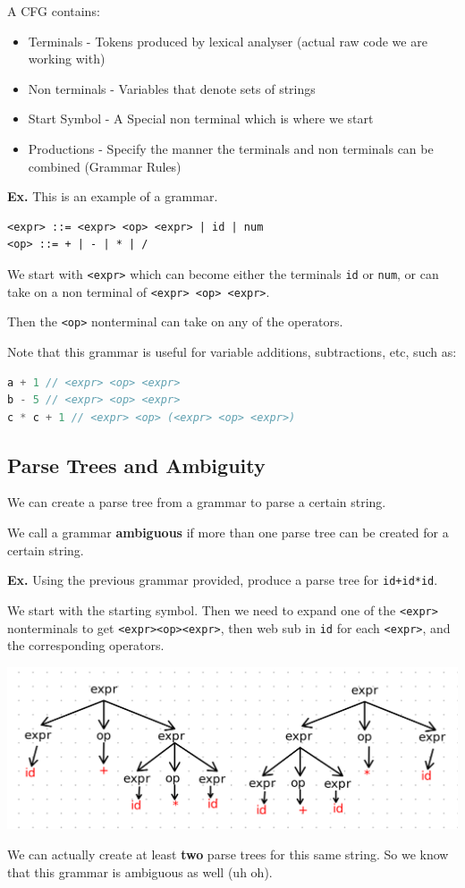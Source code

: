 \documentclass[12pt,letterpaper]{article} \usepackage{amsmath} \usepackage{graphicx} \usepackage[margin=1in]{geometry} \usepackage{longtable}  \usepackage{amssymb}
\begin{document}
	A CFG contains: 
	\begin{itemize}
		\item Terminals - Tokens produced by lexical analyser (actual raw code we are working with)
		\item Non terminals - Variables that denote sets of strings
		\item Start Symbol - A Special non terminal which is where we start
		\item Productions - Specify the manner the terminals and non terminals can be combined (Grammar Rules)
	\end{itemize}
	\begin{mdframed}
		\textbf{Ex.} This is an example of a grammar. 
		\begin{lstlisting}
<expr> ::= <expr> <op> <expr> | id | num
<op> ::= + | - | * | /	
		\end{lstlisting}
		We start with \verb*|<expr>| which can become either the terminals \verb*|id| or \verb*|num|, or can take on a non terminal of \verb*|<expr> <op> <expr>|.
		
		Then the \verb*|<op>| nonterminal can take on any of the operators. 
		
		Note that this grammar is useful for variable additions, subtractions, etc, such as:
		\begin{lstlisting}[language=java]
a + 1 // <expr> <op> <expr>
b - 5 // <expr> <op> <expr>
c * c + 1 // <expr> <op> (<expr> <op> <expr>)
		\end{lstlisting}
	\end{mdframed}
	\subsection{Parse Trees and Ambiguity}
	We can create a parse tree from a grammar to parse a certain string. 
	
	We call a grammar \textbf{ambiguous} if more than one parse tree can be created for a certain string. 
	
	\begin{mdframed}
		\textbf{Ex.} Using the previous grammar provided, produce a parse tree for \verb*|id+id*id|. 
		
		We start with the starting symbol. Then we need to expand one of the \verb*|<expr>| nonterminals to get \verb*|<expr><op><expr>|, then web sub in \verb*|id| for each \verb*|<expr>|, and the corresponding operators. 
		\begin{center}
			\includegraphics[width=0.7\linewidth]{2-parse-trees-ex}
		\end{center}
		We can actually create at least \textbf{two} parse trees for this same string. So we know that this grammar is ambiguous as well (uh oh).
	\end{mdframed}
\end{document}
